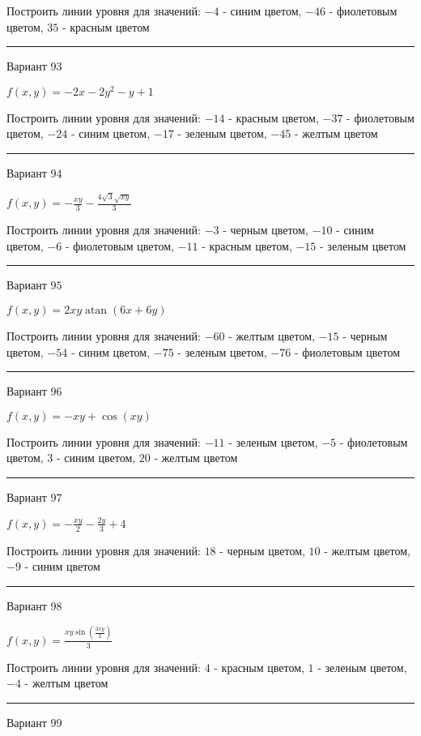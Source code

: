 \documentclass[11pt]{report}
\begin{document}
Построить линии уровня для значений: $-4$ - синим цветом, $-46$ - фиолетовым цветом, $35$ - красным цветом
\begin{center}
\noindent\rule{8cm}{0.4pt}
\end{center}
Вариант $93$


$f(x, y) = - 2 x - 2 y^{2} - y + 1$

Построить линии уровня для значений: $-14$ - красным цветом, $-37$ - фиолетовым цветом, $-24$ - синим цветом, $-17$ - зеленым цветом, $-45$ - желтым цветом
\begin{center}
\noindent\rule{8cm}{0.4pt}
\end{center}
Вариант $94$


$f(x, y) = - \frac{x y}{3} - \frac{4 \sqrt{3} \sqrt{x y}}{3}$

Построить линии уровня для значений: $-3$ - черным цветом, $-10$ - синим цветом, $-6$ - фиолетовым цветом, $-11$ - красным цветом, $-15$ - зеленым цветом
\begin{center}
\noindent\rule{8cm}{0.4pt}
\end{center}
Вариант $95$


$f(x, y) = 2 x y \operatorname{atan}{\left(6 x + 6 y \right)}$

Построить линии уровня для значений: $-60$ - желтым цветом, $-15$ - черным цветом, $-54$ - синим цветом, $-75$ - зеленым цветом, $-76$ - фиолетовым цветом
\begin{center}
\noindent\rule{8cm}{0.4pt}
\end{center}
Вариант $96$


$f(x, y) = - x y + \cos{\left(x y \right)}$

Построить линии уровня для значений: $-11$ - зеленым цветом, $-5$ - фиолетовым цветом, $3$ - синим цветом, $20$ - желтым цветом
\begin{center}
\noindent\rule{8cm}{0.4pt}
\end{center}
Вариант $97$


$f(x, y) = - \frac{x y}{2} - \frac{2 y}{3} + 4$

Построить линии уровня для значений: $18$ - черным цветом, $10$ - желтым цветом, $-9$ - синим цветом
\begin{center}
\noindent\rule{8cm}{0.4pt}
\end{center}
Вариант $98$


$f(x, y) = \frac{x y \sin{\left(\frac{3 x y}{2} \right)}}{3}$

Построить линии уровня для значений: $4$ - красным цветом, $1$ - зеленым цветом, $-4$ - желтым цветом
\begin{center}
\noindent\rule{8cm}{0.4pt}
\end{center}
Вариант $99$
\end{document}

